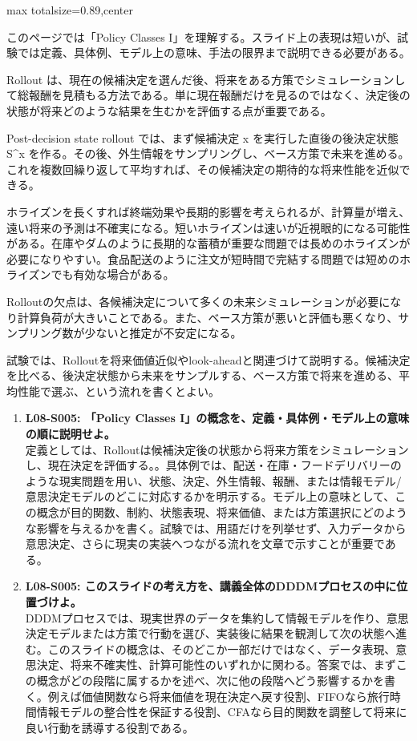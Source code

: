 \begin{minipage}[t]{0.58\textwidth}
\begin{adjustbox}{max totalsize={\textwidth}{0.89\textheight},center}
\begin{minipage}{\textwidth}\scriptsize
{}このページでは「Policy Classes I」を理解する。スライド上の表現は短いが、試験では定義、具体例、モデル上の意味、手法の限界まで説明できる必要がある。\par
Rollout は、現在の候補決定を選んだ後、将来をある方策でシミュレーションして総報酬を見積もる方法である。単に現在報酬だけを見るのではなく、決定後の状態が将来どのような結果を生むかを評価する点が重要である。\par
Post-decision state rollout では、まず候補決定 x を実行した直後の後決定状態 S\textasciicircum{}x を作る。その後、外生情報をサンプリングし、ベース方策で未来を進める。これを複数回繰り返して平均すれば、その候補決定の期待的な将来性能を近似できる。\par
ホライズンを長くすれば終端効果や長期的影響を考えられるが、計算量が増え、遠い将来の予測は不確実になる。短いホライズンは速いが近視眼的になる可能性がある。在庫やダムのように長期的な蓄積が重要な問題では長めのホライズンが必要になりやすい。食品配送のように注文が短時間で完結する問題では短めのホライズンでも有効な場合がある。\par
Rolloutの欠点は、各候補決定について多くの未来シミュレーションが必要になり計算負荷が大きいことである。また、ベース方策が悪いと評価も悪くなり、サンプリング数が少ないと推定が不安定になる。\par
試験では、Rolloutを将来価値近似やlook-aheadと関連づけて説明する。候補決定を比べる、後決定状態から未来をサンプルする、ベース方策で将来を進める、平均性能で選ぶ、という流れを書くとよい。\par{}\begin{enumerate}\item \textbf{L08-S005: 「Policy Classes I」の概念を、定義・具体例・モデル上の意味の順に説明せよ。}\\定義としては、Rolloutは候補決定後の状態から将来方策をシミュレーションし、現在決定を評価する。。具体例では、配送・在庫・フードデリバリーのような現実問題を用い、状態、決定、外生情報、報酬、または情報モデル/意思決定モデルのどこに対応するかを明示する。モデル上の意味として、この概念が目的関数、制約、状態表現、将来価値、または方策選択にどのような影響を与えるかを書く。試験では、用語だけを列挙せず、入力データから意思決定、さらに現実の実装へつながる流れを文章で示すことが重要である。\item \textbf{L08-S005: このスライドの考え方を、講義全体のDDDMプロセスの中に位置づけよ。}\\DDDMプロセスでは、現実世界のデータを集約して情報モデルを作り、意思決定モデルまたは方策で行動を選び、実装後に結果を観測して次の状態へ進む。このスライドの概念は、そのどこか一部だけではなく、データ表現、意思決定、将来不確実性、計算可能性のいずれかに関わる。答案では、まずこの概念がどの段階に属するかを述べ、次に他の段階へどう影響するかを書く。例えば価値関数なら将来価値を現在決定へ戻す役割、FIFOなら旅行時間情報モデルの整合性を保証する役割、CFAなら目的関数を調整して将来に良い行動を誘導する役割である。\end{enumerate}

\end{minipage}
\end{adjustbox}
\end{minipage}
